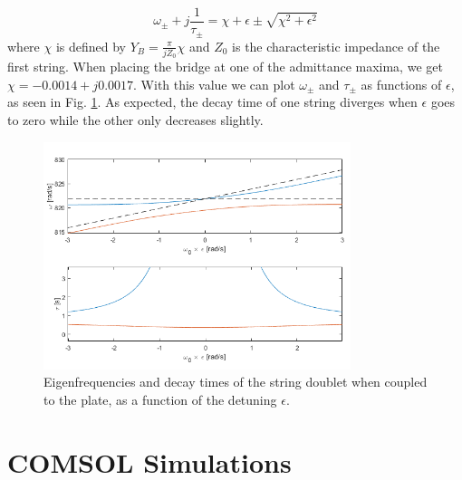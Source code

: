 \documentclass[a4paper]{article}
\begin{document}
$$ \omega_{\pm} + j \frac{1}{\tau_{\pm}} = \chi + \epsilon \pm \sqrt{\chi^2 + \epsilon^2}  $$
where $\chi$ is defined by $Y_B = \frac{\pi }{j Z_0}\chi$ and $Z_0$ is the characteristic impedance of the first string. When placing the bridge at one of the admittance maxima, we get $\chi = -0.0014 + j 0.0017$. With this value we can plot $\omega_{\pm}$ and $\tau_{\pm}$ as functions of $\epsilon$, as seen in Fig. \ref{fig:doub}. As expected, the decay time of one string diverges when $\epsilon$ goes to zero while the other only decreases slightly.

\begin{figure}[h]
	\centering
	\includegraphics[width=0.8\textwidth]{doublet.png}
	\caption{Eigenfrequencies and decay times of the string doublet when coupled to the plate, as a function of the detuning $\epsilon$.}
	\label{fig:doub}
\end{figure}

\printbibliography

\appendix
\newpage
\section{COMSOL Simulations}
\end{document}
